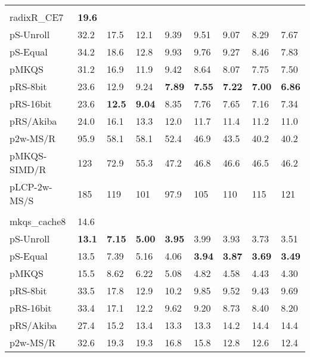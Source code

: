 \documentclass[a4paper]{myjournal}
\begin{document}
\begin{table}
\begin{tabularx}{\linewidth}{l|*{8}{>{\hfill}X}|@{}}
& \multicolumn{8}{l|}{\textbf{Random}, , , } \\ \cline{2-9}
radixR\_CE7 & \bf 19.6 &  &  &  &  &  &  &  \\
pS-Unroll & 32.2 &     17.5 &     12.1 &     9.39 &     9.51 &     9.07 &     8.29 &     7.67 \\
 pS-Equal & 34.2 &     18.6 &     12.8 &     9.93 &     9.76 &     9.27 &     8.46 &     7.83 \\
        pMKQS & 31.2 &     16.9 &     11.9 &     9.42 &     8.64 &     8.07 &     7.75 &     7.50 \\
     pRS-8bit & 23.6 &     12.9 &     9.24 & \bf 7.89 & \bf 7.55 & \bf 7.22 & \bf 7.00 & \bf 6.86 \\
    pRS-16bit & 23.6 & \bf 12.5 & \bf 9.04 &     8.35 &     7.76 &     7.65 &     7.16 &     7.34 \\
    pRS/Akiba & 24.0 &     16.1 &     13.3 &     12.0 &     11.7 &     11.4 &     11.2 &     11.0 \\
     p2w-MS/R & 95.9 &     58.1 &     58.1 &     52.4 &     46.9 &     43.5 &     40.2 &     40.2 \\
 pMKQS-SIMD/R &  123 &     72.9 &     55.3 &     47.2 &     46.8 &     46.6 &     46.5 &     46.2 \\
 pLCP-2w-MS/S &  185 &      119 &      101 &     97.9 &      105 &      110 &      115 &      121 \\ \hline
& \multicolumn{8}{l|}{\textbf{GOV2}, , , } \\ \cline{2-9}
mkqs\_cache8 & 14.6 &  &  &  &  &  &  &  \\
pS-Unroll & \bf 13.1 & \bf 7.15 & \bf 5.00 & \bf 3.95 &     3.99 &     3.93 &     3.73 &     3.51 \\
 pS-Equal &     13.5 &     7.39 &     5.16 &     4.06 & \bf 3.94 & \bf 3.87 & \bf 3.69 & \bf 3.49 \\
        pMKQS &     15.5 &     8.62 &     6.22 &     5.08 &     4.82 &     4.58 &     4.43 &     4.30 \\
     pRS-8bit &     33.5 &     17.8 &     12.9 &     10.2 &     9.85 &     9.52 &     9.43 &     9.69 \\
    pRS-16bit &     33.4 &     17.1 &     12.2 &     9.62 &     9.20 &     8.73 &     8.40 &     8.20 \\
    pRS/Akiba &     27.4 &     15.2 &     13.4 &     13.3 &     13.3 &     14.2 &     14.4 &     14.4 \\
     p2w-MS/R &     32.6 &     19.3 &     19.3 &     16.8 &     15.8 &     12.8 &     12.6 &     12.4 \\

\end{tabularx}
\end{table}
\end{document}
